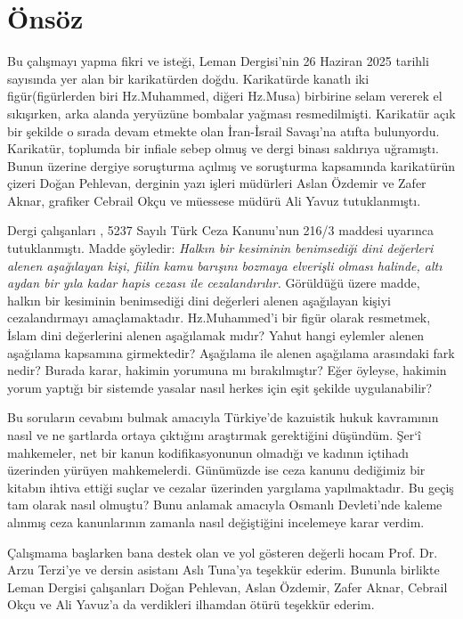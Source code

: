 \section*{Önsöz}
\indent\indent Bu çalışmayı yapma fikri ve isteği, Leman Dergisi'nin 26 Haziran 2025 tarihli sayısında yer alan bir karikatürden doğdu. Karikatürde kanatlı iki figür(figürlerden biri Hz.Muhammed, diğeri Hz.Musa)
birbirine selam vererek el sıkışırken, arka alanda yeryüzüne bombalar yağması resmedilmişti. Karikatür açık bir şekilde o sırada devam etmekte olan İran-İsrail Savaşı'na atıfta bulunyordu. Karikatür, toplumda
bir infiale sebep olmuş ve dergi binası saldırıya uğramıştı. Bunun üzerine dergiye soruşturma açılmış ve soruşturma kapsamında karikatürün çizeri Doğan Pehlevan, derginin yazı işleri müdürleri Aslan Özdemir
ve Zafer Aknar, grafiker Cebrail Okçu ve müessese müdürü Ali Yavuz tutuklanmıştı.

Dergi çalışanları , 5237 Sayılı Türk Ceza Kanunu'nun 216/3 maddesi uyarınca tutuklanmıştı. Madde şöyledir: \textit{Halkın bir kesiminin benimsediği dini değerleri alenen aşağılayan kişi, fiilin kamu barışını bozmaya elverişli olması halinde, altı aydan bir yıla kadar hapis cezası ile cezalandırılır.}
Görüldüğü üzere madde, halkın bir kesiminin benimsediği dini değerleri alenen aşağılayan kişiyi cezalandırmayı amaçlamaktadır. Hz.Muhammed'i bir figür olarak resmetmek, İslam dini değerlerini alenen aşağılamak mıdır? 
Yahut hangi eylemler alenen aşağılama kapsamına girmektedir? Aşağılama ile alenen aşağılama arasındaki fark nedir? Burada karar, hakimin yorumuna mı bırakılmıştır? Eğer öyleyse, hakimin yorum yaptığı bir sistemde yasalar 
nasıl herkes için eşit şekilde uygulanabilir? 

Bu soruların cevabını bulmak amacıyla Türkiye'de kazuistik hukuk kavramının nasıl ve ne şartlarda ortaya çıktığını araştırmak gerektiğini düşündüm. Şer`î mahkemeler, net bir kanun kodifikasyonunun olmadığı ve kadının içtihadı üzerinden yürüyen mahkemelerdi. Günümüzde ise ceza kanunu 
dediğimiz bir kitabın ihtiva ettiği suçlar ve cezalar üzerinden yargılama yapılmaktadır. Bu geçiş tam olarak nasıl olmuştu? Bunu anlamak amacıyla Osmanlı Devleti'nde kaleme alınmış ceza kanunlarının zamanla nasıl değiştiğini incelemeye karar verdim.

Çalışmama başlarken bana destek olan ve yol gösteren değerli hocam Prof. Dr. Arzu Terzi'ye ve dersin asistanı Aslı Tuna'ya teşekkür ederim. Bununla birlikte Leman Dergisi çalışanları Doğan Pehlevan, Aslan Özdemir, Zafer Aknar, Cebrail Okçu ve Ali Yavuz'a da verdikleri ilhamdan ötürü teşekkür ederim.

\clearpage